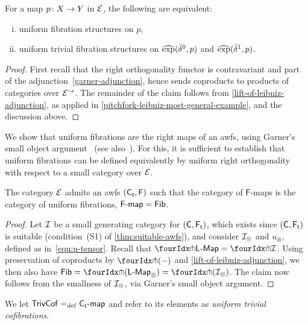 \documentclass[reqno,10pt,a4paper,oneside,draft]{amsart}
\newcommand{\LL}{\mathsf{L}}
\begin{document}
{{\begin{proposition} \label{prod-exp-general}
For a map $p \co X \to Y$ in $\catE$, the following are equivalent:
\begin{enumerate}[(i)]
\item uniform fibration structures on $p$,
\item uniform trivial fibration structures on $\hatexp(\bar{\delta}^0, p)$ and $\hatexp(\bar{\delta}^1, p)$.
\end{enumerate}
\end{proposition}

\begin{proof}
First recall that the right orthogonality functor is contravariant and part of the adjunction~\eqref{garner-adjunction}, hence sends coproducts to products of categories over $\catE^\to$.
The remainder of the claim follows from \cref{lift-of-leibniz-adjunction}, as applied in \cref{pitchfork-leibniz-most-general-example}, and the discussion above.
\end{proof}

We show that uniform fibrations are the right maps of an awfs, using Garner's small object argument~\cite{garner:small-object-argument} (see also~\cite[Proposition~16]{bourke-garner-I}).
For this, it is sufficient to establish that uniform fibrations can be defined equivalently by uniform right orthogonality with respect to a small category over $\catE$.

\begin{theorem} \label{thm:sset-cset-nwfs}
The category $\cal{E}$ admits an awfs $(\TC, \FF)$ such that the category of $\mathsf{F}$-maps is the category of uniform fibrations, \ie $\palg{\mathsf{F}} = \Fib$.
\end{theorem}

\begin{proof}
Let $\cal{I}$ be a small generating category for $(\CC, \TF)$, which exists since $(\CC, \TF)$ is suitable (condition~(S1) of \cref{thm:suitable-awfs}), and consider $\cal{I}_\otimes$ and $u_\otimes$, defined as in~\eqref{equ:u-tensor}.
Recall that $\liftr{\pCoalg{\LL}} = \liftr{\cal{I}}$.
Using preservation of coproducts by $\liftr{(-)}$ and \cref{lift-of-leibniz-adjunction}, we then also have $\Fib = \liftr{(\pCoalg{\LL}_\otimes)} = \liftr{(\cal{I}_\otimes)}$.
The claim now follows from the smallness of $\cal{I}_\otimes$, via Garner's small object argument.
\end{proof}

We let $\TrivCof \defeq \pcoalg{\TC}$ and refer to its elements as \emph{uniform trivial cofibrations}.

}}
\end{document}

